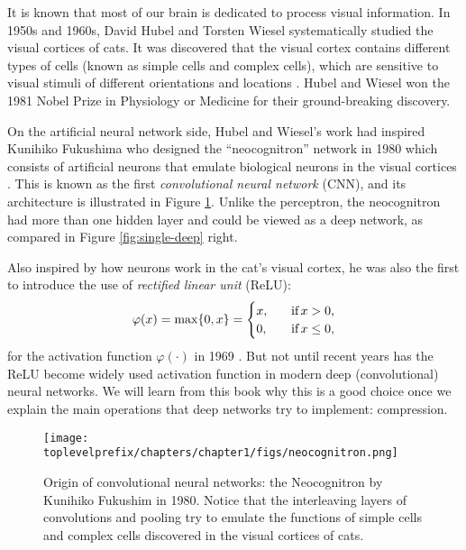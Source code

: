 \documentclass[../../book-main.tex]{subfiles}
\begin{document}
It is known that most of our brain is dedicated to process visual information. In 1950s and 1960s, David Hubel and Torsten Wiesel systematically studied the visual cortices of cats. It was discovered that the visual cortex contains different types of cells (known as simple cells and complex cells), which are sensitive to visual stimuli of different orientations and locations \cite{Hubel-Wiesel-1959}. Hubel and Wiesel won the 1981 Nobel Prize in Physiology or Medicine for their ground-breaking discovery. 


On the artificial neural network side, Hubel and Wiesel's work had inspired Kunihiko Fukushima who  designed the ``neocognitron'' network in 1980 which consists of artificial neurons that emulate biological neurons in the visual cortices \cite{Fukushima1980NeocognitronAS}. This is known as the first {\em convolutional neural network} (CNN), and its architecture is illustrated in Figure \ref{fig:neocognitron}. Unlike the perceptron, the neocognitron had more than one hidden layer and could be viewed as a deep network, as compared in Figure \ref{fig:single-deep} right.

Also inspired by how neurons work in the cat's visual cortex, he was also the first to introduce the use of {\em rectified linear unit} (ReLU):
\begin{equation}
    \varphi(x) = \max\{0, x\} = \begin{cases}x, & \text{if} \, x > 0, \\ 0, \quad & \text{if} \, x \leq 0,\end{cases}
\end{equation}
for the activation function $\varphi(\cdot)$ in 1969 \cite{Fukushima-1969}. But not until recent years has the ReLU become widely used activation function in modern deep (convolutional) neural networks. We will learn from this book why this is a good choice once we explain the main operations that deep networks try to implement: compression. 

\begin{figure}
    \centering
    \texttt{[image: \\toplevelprefix/chapters/chapter1/figs/neocognitron.png]}
    \caption{Origin of convolutional neural networks: the Neocognitron by Kunihiko Fukushim in 1980. Notice that the interleaving layers of convolutions and pooling try to emulate the functions of simple cells and complex cells discovered in the visual cortices of cats.}
    \label{fig:neocognitron}
\end{figure}
\end{document}
